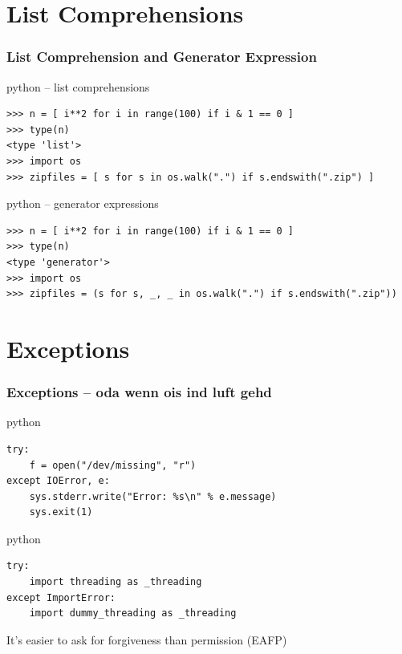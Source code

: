 \documentclass{beamer}
\begin{document}
\section{List Comprehensions}	%

\begin{frame}[fragile]
	\frametitle{List Comprehension and Generator Expression}
	\begin{exampleblock}{python -- list comprehensions}
	\begin{lstlisting}
>>> n = [ i**2 for i in range(100) if i & 1 == 0 ]
>>> type(n)
<type 'list'>
>>> import os
>>> zipfiles = [ s for s in os.walk(".") if s.endswith(".zip") ]
	\end{lstlisting}
	\end{exampleblock}

\pause
	
	\begin{exampleblock}{python -- generator expressions}
	\begin{lstlisting}
>>> n = [ i**2 for i in range(100) if i & 1 == 0 ]
>>> type(n)
<type 'generator'>
>>> import os
>>> zipfiles = (s for s, _, _ in os.walk(".") if s.endswith(".zip"))
	\end{lstlisting}
	\end{exampleblock}
\end{frame}

\section{Exceptions}	%

\begin{frame}[fragile]
	\frametitle{Exceptions -- oda wenn ois ind luft gehd}
	\begin{exampleblock}{python}
	\begin{lstlisting}
try:
    f = open("/dev/missing", "r")
except IOError, e:
    sys.stderr.write("Error: %s\n" % e.message)
    sys.exit(1)
	\end{lstlisting}
	\end{exampleblock}

\pause

	\begin{exampleblock}{python}
	\begin{lstlisting}
try:
    import threading as _threading
except ImportError:
    import dummy_threading as _threading
	\end{lstlisting}
	\end{exampleblock}
	
	It's easier to ask for forgiveness than permission (EAFP)
\end{frame}
\end{document}
